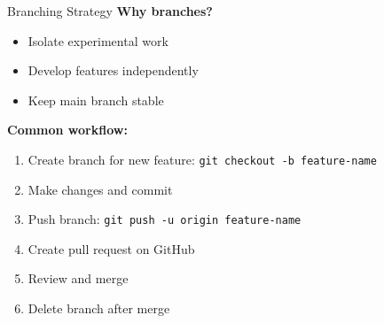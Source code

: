\documentclass[11pt,aspectratio=169]{beamer}
\begin{document}
\begin{frame}{Branching Strategy}
\textbf{Why branches?}
\begin{itemize}
    \item Isolate experimental work
    \item Develop features independently
    \item Keep main branch stable
\end{itemize}

\vspace{0.3cm}

\textbf{Common workflow:}
\begin{enumerate}
    \item Create branch for new feature: \texttt{git checkout -b feature-name}
    \item Make changes and commit
    \item Push branch: \texttt{git push -u origin feature-name}
    \item Create pull request on GitHub
    \item Review and merge
    \item Delete branch after merge
\end{enumerate}
\end{frame}
\end{document}
